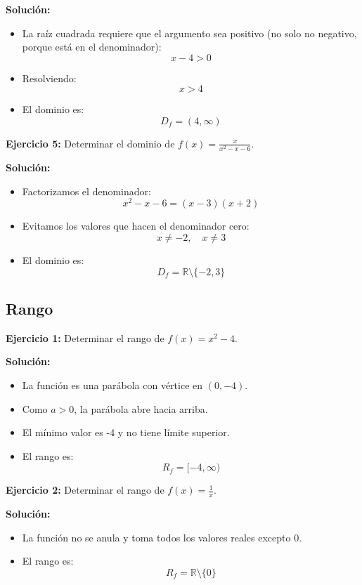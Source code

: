 \documentclass{profesor}
\begin{document}
\textbf{Solución:}  
\begin{itemize}
    \item La raíz cuadrada requiere que el argumento sea positivo (no solo no negativo, porque está en el denominador):
    \[
    x - 4 > 0
    \]
    \item Resolviendo:
    \[
    x > 4
    \]
    \item El dominio es:
    \[
    D_f = (4, \infty)
    \]
\end{itemize}

\textbf{Ejercicio 5:} Determinar el dominio de \( f(x) = \frac{x}{x^2 - x - 6} \).

\textbf{Solución:}  
\begin{itemize}
    \item Factorizamos el denominador:
    \[
    x^2 - x - 6 = (x-3)(x+2)
    \]
    \item Evitamos los valores que hacen el denominador cero:
    \[
    x \neq -2, \quad x \neq 3
    \]
    \item El dominio es:
    \[
    D_f = \mathbb{R} \setminus \{ -2, 3 \}
    \]
\end{itemize}

\newpage
\subsection{Rango}

\textbf{Ejercicio 1:} Determinar el rango de \( f(x) = x^2 - 4 \).

\textbf{Solución:}  
\begin{itemize}
    \item La función es una parábola con vértice en \( (0, -4) \).
    \item Como \( a > 0 \), la parábola abre hacia arriba.
    \item El mínimo valor es -4 y no tiene límite superior.
    \item El rango es:
    \[
    R_f = [-4, \infty)
    \]
\end{itemize}

\textbf{Ejercicio 2:} Determinar el rango de \( f(x) = \frac{1}{x} \).

\textbf{Solución:}  
\begin{itemize}
    \item La función no se anula y toma todos los valores reales excepto 0.
    \item El rango es:
    \[
    R_f = \mathbb{R} \setminus \{0\}
    \]
\end{itemize}
\end{document}
